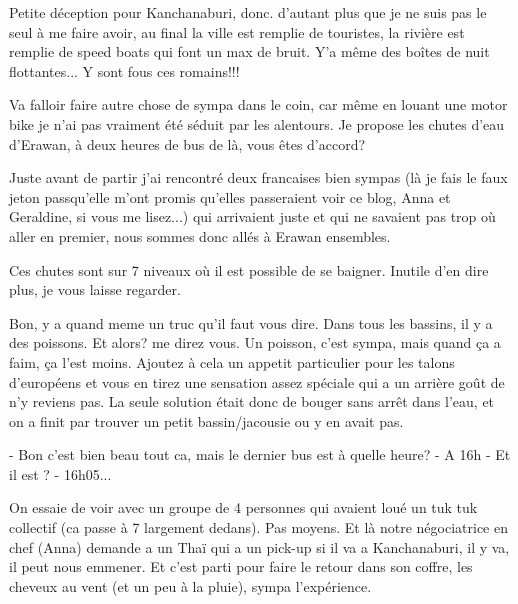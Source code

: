 {%
{%

Petite déception pour Kanchanaburi, donc. d'autant plus que je ne suis pas le seul à me faire avoir, au final la ville est remplie de touristes, la rivière est remplie de speed boats qui font un max de bruit. Y'a même des boîtes de nuit flottantes... Y sont fous ces romains!!!

Va falloir faire autre chose de sympa dans le coin, car même en louant une motor bike je n'ai pas vraiment été séduit par les alentours. Je propose les chutes d'eau d'Erawan, à deux heures de bus de là, vous êtes d'accord?

Juste avant de partir j'ai rencontré deux francaises bien sympas (là je fais le faux jeton passqu'elle m'ont promis qu'elles passeraient voir ce blog, Anna et Geraldine, si vous me lisez...) qui arrivaient juste et qui ne savaient pas trop où aller en premier, nous sommes donc allés à Erawan ensembles.

Ces chutes sont sur 7 niveaux où il est possible de se baigner. Inutile d'en dire plus, je vous laisse regarder.

{%
{%
{%
{%

Bon, y a quand meme un truc qu'il faut vous dire. Dans tous les bassins, il y a des poissons. Et alors? me direz vous. Un poisson, c'est sympa, mais quand ça a faim, ça l'est moins. Ajoutez à cela un appetit particulier pour les talons d'européens et vous en tirez une sensation assez spéciale qui a un arrière goût de n'y reviens pas. La seule solution était donc de bouger sans arrêt dans l'eau, et on a finit par trouver un petit bassin/jacousie ou y en avait pas.

- Bon c'est bien beau tout ca, mais le dernier bus est à quelle heure?
- A 16h
- Et il est ?
- 16h05...

On essaie de voir avec un groupe de 4 personnes qui avaient loué un tuk tuk collectif (ca passe à 7 largement dedans). Pas moyens. Et là notre négociatrice en chef (Anna) demande a un Thaï qui a un pick-up si il va a Kanchanaburi, il y va, il peut nous emmener. Et c'est parti pour faire le retour dans son coffre, les cheveux au vent (et un peu à la pluie), sympa l'expérience.

}}}}}}
